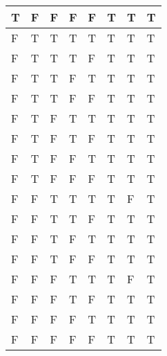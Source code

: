 \documentclass[10.5pt]{article}
\newenvironment{solution}[2][Solution]{ \begin{trivlist}
\item[\hskip \labelsep {\bfseries #1}]}{\end{trivlist}}
\begin{document}
\begin{solution}{2}
\begin{table}[!h]
\begin{tabular}{|l|l|l|l|l|l|l|l|}
T & F & F & F & F & T & T & T                                                                    \\ \hline
F & T & T & T & T & T & T & T                                                                    \\ \hline
F & T & T & T & F & T & T & T                                                                    \\ \hline
F & T & T & F & T & T & T & T                                                                    \\ \hline
F & T & T & F & F & T & T & T                                                                    \\ \hline
F & T & F & T & T & T & T & T                                                                    \\ \hline
F & T & F & T & F & T & T & T                                                                    \\ \hline
F & T & F & F & T & T & T & T                                                                    \\ \hline
F & T & F & F & F & T & T & T                                                                    \\ \hline
F & F & T & T & T & T & F & T                                                                    \\ \hline
F & F & T & T & F & T & T & T                                                                    \\ \hline
F & F & T & F & T & T & T & T                                                                    \\ \hline
F & F & T & F & F & T & T & T                                                                    \\ \hline
F & F & F & T & T & T & F & T                                                                    \\ \hline
F & F & F & T & F & T & T & T                                                                    \\ \hline
F & F & F & F & T & T & T & T                                                                    \\ \hline
F & F & F & F & F & T & T & T                                                                    \\ \hline
\end{tabular}
\end{table}

\end{solution}
\end{document}
